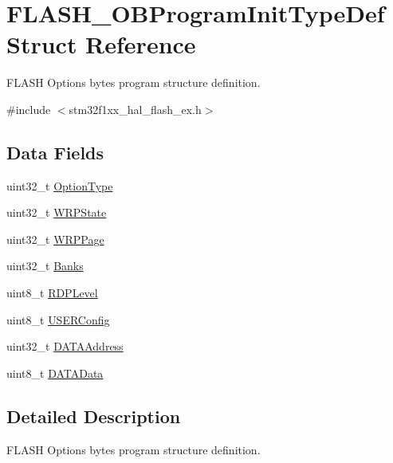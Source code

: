 \hypertarget{struct_f_l_a_s_h___o_b_program_init_type_def}{}\section{F\+L\+A\+S\+H\+\_\+\+O\+B\+Program\+Init\+Type\+Def Struct Reference}
\label{struct_f_l_a_s_h___o_b_program_init_type_def}


F\+L\+A\+SH Options bytes program structure definition.  




{\ttfamily \#include $<$stm32f1xx\+\_\+hal\+\_\+flash\+\_\+ex.\+h$>$}

\subsection*{Data Fields}
\begin{DoxyCompactItemize}
\item 
uint32\+\_\+t \hyperlink{struct_f_l_a_s_h___o_b_program_init_type_def_ac5941efaeb6bd9e3c0852613f990ebd8}{Option\+Type}
\item 
uint32\+\_\+t \hyperlink{struct_f_l_a_s_h___o_b_program_init_type_def_ab5ab320199482e9eb21dc8460501dea5}{W\+R\+P\+State}
\item 
uint32\+\_\+t \hyperlink{struct_f_l_a_s_h___o_b_program_init_type_def_ae5bf1ca4800efd0ac1f1663a4778766b}{W\+R\+P\+Page}
\item 
uint32\+\_\+t \hyperlink{struct_f_l_a_s_h___o_b_program_init_type_def_aa07868a5b012861c6111322c3dccdbec}{Banks}
\item 
uint8\+\_\+t \hyperlink{struct_f_l_a_s_h___o_b_program_init_type_def_a02805f4f14c920bc29b38927556d3f45}{R\+D\+P\+Level}
\item 
uint8\+\_\+t \hyperlink{struct_f_l_a_s_h___o_b_program_init_type_def_ac4ab84c90f7a878b0b39ec1f3dda8ded}{U\+S\+E\+R\+Config}
\item 
uint32\+\_\+t \hyperlink{struct_f_l_a_s_h___o_b_program_init_type_def_a68b628b7adfda24edb7394fd56a798cc}{D\+A\+T\+A\+Address}
\item 
uint8\+\_\+t \hyperlink{struct_f_l_a_s_h___o_b_program_init_type_def_a57161ab82bc8d25561d71583827fd38c}{D\+A\+T\+A\+Data}
\end{DoxyCompactItemize}


\subsection{Detailed Description}
F\+L\+A\+SH Options bytes program structure definition. 

